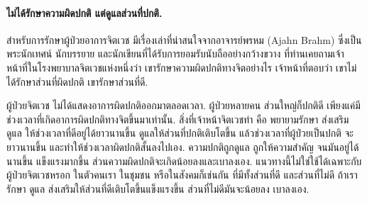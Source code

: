 {\begin{shaded}
\paragraph{ไม่ได้รักษาความผิดปกติ แต่ดูแลส่วนที่ปกติ.}
สำหรับการรักษาผู้ป่วยอาการจิตเวช มีเรื่องเล่าที่น่าสนใจจากอาจารย์พรหม (Ajahn Brahm) ซึ่งเป็นพระนักเทศน์ นักบรรยาย และนักเขียนที่ได้รับการยอมรับนับถืออย่างกว้างขวาง 
ที่ท่านเคยถามเจ้าหน้าที่ในโรงพยาบาลจิตเวชแห่งหนึ่งว่า
เขารักษาความผิดปกติทางจิตอย่างไร
เจ้าหน้าที่ตอบว่า เขาไม่ได้รักษาส่วนที่ผิดปกติ เขารักษาส่วนที่ดี.

ผู้ป่วยจิตเวช ไม่ได้แสดงอาการผิดปกติออกมาตลอดเวลา.
ผู้ป่วยหลายคน ส่วนใหญ่ก็ปกติดี เพียงแค่มีช่วงเวลาที่เกิดอาการผิดปกติทางจิตขึ้นมาเท่านั้น.
สิ่งที่เจ้าหน้าจิตเวชทำ คือ พยายามรักษา ส่งเสริม ดูแล ให้ช่วงเวลาที่ดีอยู่ได้ยาวนานขึ้น ดูแลให้ส่วนที่ปกติเติบโตขึ้น
แล้วช่วงเวลาที่ผู้ป่วยเป็นปกติ จะยาวนานขึ้น และทำให้ช่วงเวลาผิดปกติสั้นลงไปเอง.
ความปกติถูกดูแล ถูกให้ความสำคัญ จนมันอยู่ได้นานขึ้น แข็งแรงมากขึ้น
ส่วนความผิดปกติจะเกิดน้อยลงและเบาลงเอง.
แนวทางนี้ไม่ใช่ใช้ได้เฉพาะกับผู้ป่วยจิตเวชหรอก 
ในตัวคนเรา ในชุมชน หรือในสังคมก็เช่นกัน ที่มีทั้งส่วนที่ดี และส่วนที่ไม่ดี
ถ้าเรารักษา ดูแล ส่งเสริมให้ส่วนที่ดีเติบโตขึ้นแข็งแรงขึ้น
ส่วนที่ไม่ดีมันจะน้อยลง เบาลงเอง.

		\vspace{0.5cm}		
		\begin{Parallel}[c]{0.5\textwidth}{0.45\textwidth}
		\end{Parallel}
		
		
	\end{shaded}
}%

